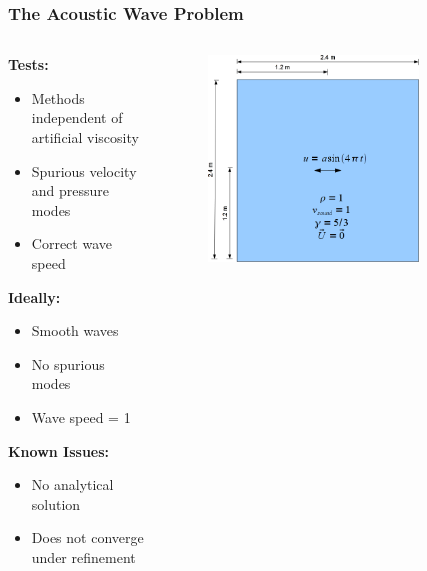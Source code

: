 \documentclass[8pt,xcolor=svgnames]{beamer}
\begin{document}
\begin{frame}
 \frametitle{The Acoustic Wave Problem}
\begin{columns}
 \begin{column}{0.3\textwidth}
\textbf{Tests:}
  \begin{itemize}
   \item Methods independent of artificial viscosity
   \item Spurious velocity and pressure modes
   \item Correct wave speed
  \end{itemize}

\textbf{Ideally:}
\begin{itemize}
 \item Smooth waves
 \item No spurious modes
 \item Wave speed = 1
\end{itemize}

\textbf{Known Issues:}
\begin{itemize}
 \item No analytical solution
 \item Does not converge under refinement
\end{itemize}

 \end{column}
 \begin{column}{0.7\textwidth}
    \begin{figure}[h!]
    \centering
    \includegraphics[width=0.8\textwidth,keepaspectratio=true]{./Images/AcousticWave.png}
    \end{figure}
 \end{column}
\end{columns}
\end{frame}
\end{document}
